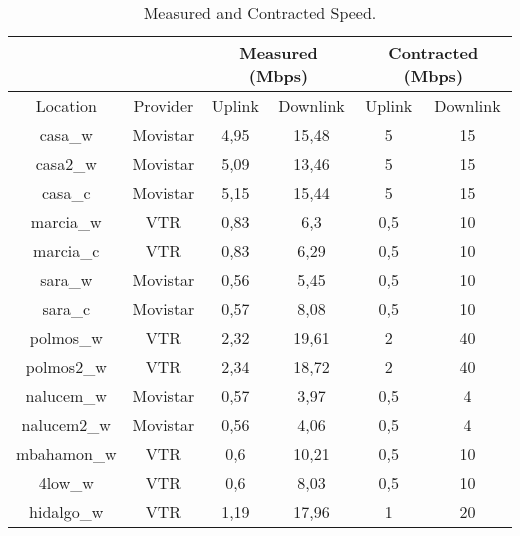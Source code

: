 \begin{table}[ht]
\caption[Speed Test: Measured and Contracted Speed ]{Measured and Contracted Speed.}
\begin{center}
\begin{tabular}{|c|c||c|c||c|c||}
\hline
&&\multicolumn{2}{|c||}{Measured (Mbps)} & \multicolumn{2}{|c||}{Contracted (Mbps)} \\ \hline	
Location	& Provider	& Uplink 	  	 & Downlink  &	Uplink	& Downlink \\ \hline \hline 
casa\_w		& Movistar	& 4,95			 & 15,48	 & 5		& 15 \\ \hline 
casa2\_w	& Movistar	& 5,09			 & 13,46	 & 5		& 15 \\ \hline 
casa\_c	 	& Movistar	& 5,15			 & 15,44	 & 5		& 15 \\ \hline 
marcia\_w	& VTR		& 0,83			 & 6,3 	 	 & 0,5		& 10 \\ \hline 
marcia\_c	& VTR		& 0,83			 & 6,29	 	 & 0,5		& 10 \\ \hline 
sara\_w		& Movistar	& 0,56			 & 5,45		 & 0,5		& 10 \\ \hline 
sara\_c		& Movistar	& 0,57			 & 8,08		 & 0,5		& 10 \\ \hline 
polmos\_w	& VTR		& 2,32			 & 19,61	 & 2		& 40 \\ \hline 
polmos2\_w	& VTR		& 2,34			 & 18,72	 & 2		& 40 \\ \hline 
nalucem\_w	& Movistar	& 0,57			 & 3,97	 	 & 0,5		& 4 \\ \hline
nalucem2\_w	& Movistar	& 0,56			 & 4,06		 & 0,5		& 4 \\ \hline
mbahamon\_w	& VTR		& 0,6 			 & 10,21	 & 0,5		& 10 \\ \hline
4low\_w		& VTR		& 0,6			 & 8,03		 & 0,5		& 10 \\ \hline
hidalgo\_w	& VTR		& 1,19			 & 17,96	 & 1		& 20 \\ \hline
\end{tabular}
\end{center}
\label{table:comparative}
\end{table}
